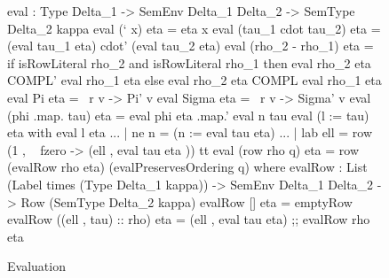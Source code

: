 \begin{figure}
\begin{agdaf}
eval : Type Delta_1 -> SemEnv Delta_1  Delta_2 -> SemType Delta_2  kappa
eval (` x) eta = eta x
eval (tau_1  cdot  tau_2) eta = (eval tau_1  eta) cdot' (eval tau_2  eta)
eval (rho_2 - rho_1) eta = 
  if isRowLiteral rho_2 and isRowLiteral rho_1
  then eval rho_2 eta COMPL' eval rho_1 eta 
  else eval rho_2 eta COMPL eval rho_1 eta
eval Pi eta = \ r v -> Pi' v
eval Sigma eta = \ r v -> Sigma' v
eval (phi .map. tau) eta = eval phi eta .map.' eval n tau
eval (l := tau) eta with eval l eta 
... | ne n = (n := eval tau eta)
... | lab ell = row (1 , \ { 
        fzero -> (ell , eval tau eta )}) tt
eval (row rho q) eta = row 
  (evalRow rho eta) 
  (evalPreservesOrdering q)
where
  evalRow : List (Label times (Type Delta_1 kappa)) -> 
            SemEnv Delta_1  Delta_2 -> Row (SemType Delta_2 kappa)
  evalRow [] eta = emptyRow
  evalRow ((ell , tau) :: rho) eta = 
    (ell , eval tau eta) ;; evalRow rho eta
\end{agdaf}
\caption{Evaluation}
\label{fig:evaluation}
\end{figure}
